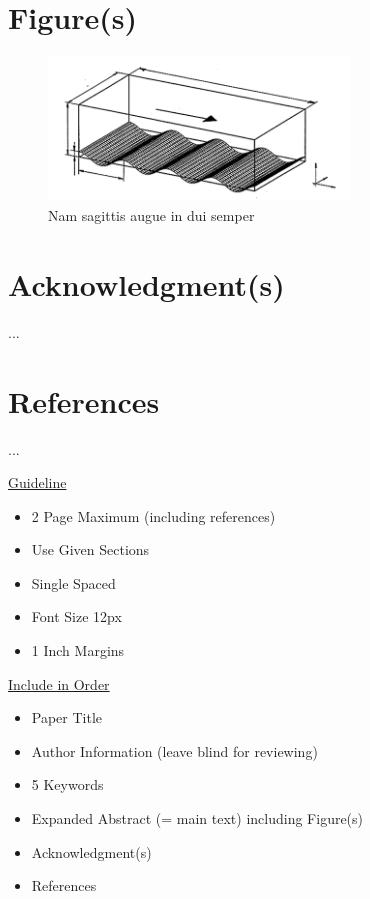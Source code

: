 \documentclass[a4paper,12pt]{article}
\begin{document}
\pagebreak

\section{Figure(s)}

\begin{figure}[htp]
\centering
\includegraphics[width=8cm]{figuexample.png}
\caption{Nam sagittis augue in dui semper}
\label{fig:image}
\end{figure}


\section{Acknowledgment(s)}
...


\section{References}
...


\vskip 40pt
\underline {Guideline}
\begin{itemize}
\itemsep0pt
  \item 2 Page Maximum (including references)
  \item Use Given Sections
  \item Single Spaced
  \item Font Size 12px
  \item 1 Inch Margins
  \end{itemize}

\underline {Include in Order}
\begin{itemize}
\itemsep0pt
  \item Paper Title
  \item Author Information (leave blind for reviewing)
  \item 5 Keywords
  \item Expanded Abstract (= main text)  including Figure(s)
  \item Acknowledgment(s) 
  \item References
\end{itemize}
\end{document}
